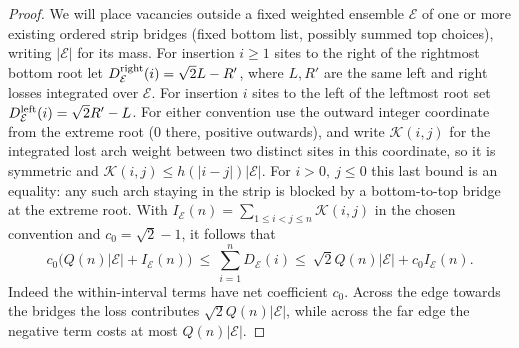 \begin{proof}
We will place vacancies outside a fixed weighted ensemble \(\mathcal E\) of one or more existing ordered strip bridges (fixed bottom list, possibly summed top choices), writing \(|\mathcal E|\) for its mass. For insertion \(i\ge1\) sites to the right of the rightmost bottom root let \(D^{\rm right}_{\mathcal E}(i)=\sqrt2 L-R'\), where \(L,R'\) are the same left and right losses integrated over \(\mathcal E\). For insertion \(i\) sites to the left of the leftmost root set \(D^{\rm left}_{\mathcal E}(i)=\sqrt2 R'-L\). For either convention use the outward integer coordinate from the extreme root (0 there, positive outwards), and write \(\mathscr K(i,j)\) for the integrated lost arch weight between two distinct sites in this coordinate, so it is symmetric and \(\mathscr K(i,j)\le h(|i-j|)|\mathcal E|\). For \(i>0,\ j\le0\) this last bound is an equality: any such arch staying in the strip is blocked by a bottom-to-top bridge at the extreme root. With \(I_{\mathcal E}(n)=\sum_{1\le i<j\le n}\mathscr K(i,j)\) in the chosen convention and \(c_0=\sqrt2-1\), it follows that
\begin{equation}
 c_0\big(Q(n)|\mathcal E|+I_{\mathcal E}(n)\big)
 \ \le\ \sum_{i=1}^n D_{\mathcal E}(i)
 \le\ \sqrt2 Q(n)|\mathcal E|+c_0 I_{\mathcal E}(n).                     \label{c2:eq-B2}
\end{equation}
Indeed the within-interval terms have net coefficient \(c_0\). Across the edge towards the bridges the loss contributes \(\sqrt2 Q(n)|\mathcal E|\), while across the far edge the negative term costs at most \(Q(n)|\mathcal E|\).


\end{proof}
